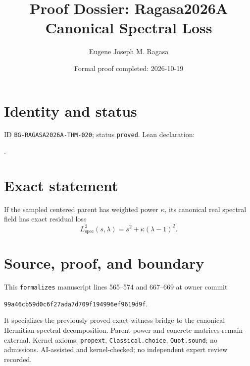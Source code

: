 \documentclass[11pt]{article}
\title{Proof Dossier: Ragasa2026A Canonical Spectral Loss}\author{Eugene Joseph M. Ragasa}\date{Formal proof completed: 2026-10-19}
\begin{document}
\maketitle
\section{Identity and status}
ID \texttt{BG-RAGASA2026A-THM-020}; status \texttt{proved}. Lean declaration:
\par{}.
\section{Exact statement}
If the sampled centered parent has weighted power $\kappa$, its canonical real spectral
field has exact residual loss
\[L_{\mathrm{spec}}^2(s,\lambda)=s^2+\kappa(\lambda-1)^2.\]
\section{Source, proof, and boundary}
This \texttt{formalizes} manuscript lines 565--574 and 667--669 at owner commit
\begin{center}\small\texttt{99a46cb59d0c6f27ada7d709f194996ef9619d9f}.\end{center}
It specializes the previously proved exact-witness bridge to the canonical Hermitian
spectral decomposition. Parent power and concrete matrices remain external. Kernel
axioms: \texttt{propext}, \texttt{Classical.choice}, \texttt{Quot.sound}; no admissions.
AI-assisted and kernel-checked; no independent expert review recorded.
\end{document}
